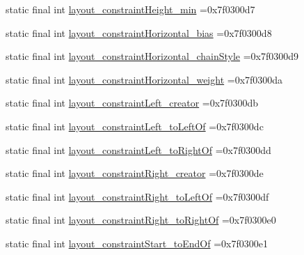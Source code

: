 \begin{DoxyCompactItemize}
\item 
static final int \mbox{\hyperlink{classbr_1_1unb_1_1cic_1_1mp_1_1marketmaster_1_1test_1_1R_1_1attr_aadc39f1be0602c45b2cab26cff2aa721}{layout\+\_\+constraint\+Height\+\_\+min}} =0x7f0300d7
\item 
static final int \mbox{\hyperlink{classbr_1_1unb_1_1cic_1_1mp_1_1marketmaster_1_1test_1_1R_1_1attr_aaf7b6e997aa41a33d033c75c395ff630}{layout\+\_\+constraint\+Horizontal\+\_\+bias}} =0x7f0300d8
\item 
static final int \mbox{\hyperlink{classbr_1_1unb_1_1cic_1_1mp_1_1marketmaster_1_1test_1_1R_1_1attr_a1c92b22eee1481d1447f7e0020e1d001}{layout\+\_\+constraint\+Horizontal\+\_\+chain\+Style}} =0x7f0300d9
\item 
static final int \mbox{\hyperlink{classbr_1_1unb_1_1cic_1_1mp_1_1marketmaster_1_1test_1_1R_1_1attr_a81a7acaf1dff268d4958ea0466b3fb34}{layout\+\_\+constraint\+Horizontal\+\_\+weight}} =0x7f0300da
\item 
static final int \mbox{\hyperlink{classbr_1_1unb_1_1cic_1_1mp_1_1marketmaster_1_1test_1_1R_1_1attr_af695bc2d91566cdaf2f855939947ebfe}{layout\+\_\+constraint\+Left\+\_\+creator}} =0x7f0300db
\item 
static final int \mbox{\hyperlink{classbr_1_1unb_1_1cic_1_1mp_1_1marketmaster_1_1test_1_1R_1_1attr_aa1d3f76ab0875ad9771b048e92405f3d}{layout\+\_\+constraint\+Left\+\_\+to\+Left\+Of}} =0x7f0300dc
\item 
static final int \mbox{\hyperlink{classbr_1_1unb_1_1cic_1_1mp_1_1marketmaster_1_1test_1_1R_1_1attr_a0bb61343fa29d044a041f022ec1b04d9}{layout\+\_\+constraint\+Left\+\_\+to\+Right\+Of}} =0x7f0300dd
\item 
static final int \mbox{\hyperlink{classbr_1_1unb_1_1cic_1_1mp_1_1marketmaster_1_1test_1_1R_1_1attr_a0a1a6dbb079f4ba5786c40ee4e3e1e75}{layout\+\_\+constraint\+Right\+\_\+creator}} =0x7f0300de
\item 
static final int \mbox{\hyperlink{classbr_1_1unb_1_1cic_1_1mp_1_1marketmaster_1_1test_1_1R_1_1attr_a9a298744114eee5b5d67cd3481e8b3c1}{layout\+\_\+constraint\+Right\+\_\+to\+Left\+Of}} =0x7f0300df
\item 
static final int \mbox{\hyperlink{classbr_1_1unb_1_1cic_1_1mp_1_1marketmaster_1_1test_1_1R_1_1attr_acec002a374a6e814a4c37ecc13a6885d}{layout\+\_\+constraint\+Right\+\_\+to\+Right\+Of}} =0x7f0300e0
\item 
static final int \mbox{\hyperlink{classbr_1_1unb_1_1cic_1_1mp_1_1marketmaster_1_1test_1_1R_1_1attr_a183a89783edd7261216f596258846c6a}{layout\+\_\+constraint\+Start\+\_\+to\+End\+Of}} =0x7f0300e1

\end{DoxyCompactItemize}
